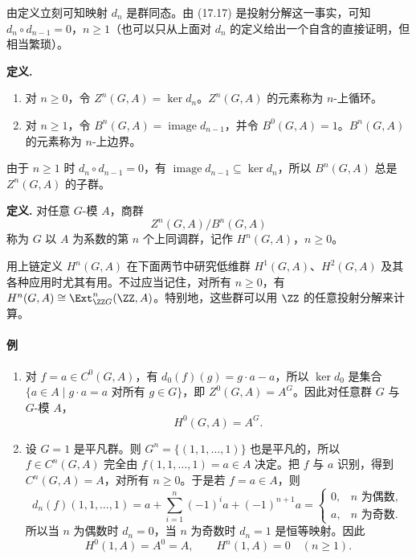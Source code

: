 由定义立刻可知映射 $d_n$ 是群同态。由 (17.17) 是投射分解这一事实，可知 $d_n\circ d_{n-1}=0$，$n\geq1$（也可以只从上面对 $d_n$ 的定义给出一个自含的直接证明，但相当繁琐）。

\noindent\textbf{定义.}
\begin{enumerate}[label=(\arabic*)]
  \item 对 $n\geq0$，令 $Z^n(G,A)=\ker d_n$。$Z^n(G,A)$ 的元素称为 $n$-上循环。
  \item 对 $n\geq1$，令 $B^n(G,A)=\operatorname{image}d_{n-1}$，并令 $B^0(G,A)=1$。$B^n(G,A)$ 的元素称为 $n$-上边界。
\end{enumerate}

由于 $n\geq1$ 时 $d_n\circ d_{n-1}=0$，有 $\operatorname{image}d_{n-1}\subseteq\ker d_n$，所以 $B^n(G,A)$ 总是 $Z^n(G,A)$ 的子群。

\noindent\textbf{定义.} 对任意 $G$-模 $A$，商群
\[
  Z^n(G,A)/B^n(G,A)
\]
称为 $G$ 以 $A$ 为系数的第 $n$ 个上同调群，记作 $H^n(G,A)$，$n\geq0$。

用上链定义 $H^n(G,A)$ 在下面两节中研究低维群 $H^1(G,A)$、$H^2(G,A)$ 及其各种应用时尤其有用。不过应当记住，对所有 $n\geq0$，有 $H^n(G,A)\cong\Ext_{
\ZZ G}^n(\ZZ,A)$。特别地，这些群可以用 $\ZZ$ 的任意投射分解来计算。

\paragraph{例}
\begin{enumerate}[label=(\arabic*)]
  \item 对 $f=a\in C^0(G,A)$，有 $d_0(f)(g)=g\cdot a-a$，所以 $\ker d_0$ 是集合 $\{a\in A\mid g\cdot a=a\text{ 对所有 }g\in G\}$，即 $Z^0(G,A)=A^G$。因此对任意群 $G$ 与 $G$-模 $A$，
  \[
    H^0(G,A)=A^G.
  \]

  \item 设 $G=1$ 是平凡群。则 $G^n=\{(1,1,
  \ldots,1)\}$ 也是平凡的，所以 $f\in C^n(G,A)$ 完全由 $f(1,1,
  \ldots,1)=a\in A$ 决定。把 $f$ 与 $a$ 识别，得到 $C^n(G,A)=A$，对所有 $n\geq0$。于是若 $f=a\in A$，则
  \[
    d_n(f)(1,1,
    \ldots,1)=a+\sum_{i=1}^{n}(-1)^ia+(-1)^{n+1}a
    =\begin{cases}
      0,& n\text{ 为偶数},\\
      a,& n\text{ 为奇数}.
    \end{cases}
  \]
  所以当 $n$ 为偶数时 $d_n=0$，当 $n$ 为奇数时 $d_n=1$ 是恒等映射。因此
  \[
    H^0(1,A)=A^0=A,
    \qquad
    H^n(1,A)=0\quad(n\geq1).
  \]
\end{enumerate}

